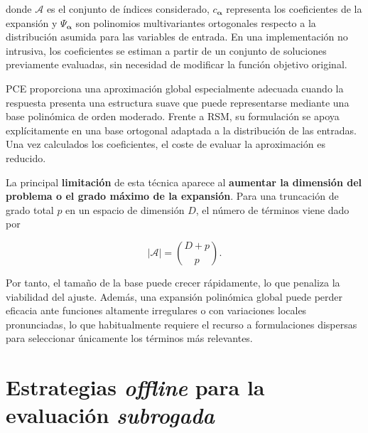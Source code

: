 donde \(\mathcal{A}\) es el conjunto de índices considerado, \(c_{\boldsymbol{\alpha}}\) representa los coeficientes de la expansión y \(\Psi_{\boldsymbol{\alpha}}\) son polinomios multivariantes ortogonales respecto a la distribución asumida para las variables de entrada. En una implementación no intrusiva, los coeficientes se estiman a partir de un conjunto de soluciones previamente evaluadas, sin necesidad de modificar la función objetivo original.

PCE proporciona una aproximación global especialmente adecuada cuando la respuesta presenta una estructura suave que puede representarse mediante una base polinómica de orden moderado. Frente a RSM, su formulación se apoya explícitamente en una base ortogonal adaptada a la distribución de las entradas. Una vez calculados los coeficientes, el coste de evaluar la aproximación es reducido.

La principal \textbf{limitación} de esta técnica aparece al \textbf{aumentar la dimensión del problema o el grado máximo de la expansión}. Para una truncación de grado total \(p\) en un espacio de dimensión \(D\), el número de términos viene dado por

\begin{equation}
    \left| \mathcal{A} \right|
    =
    \binom{D+p}{p}.
\end{equation}

Por tanto, el tamaño de la base puede crecer rápidamente, lo que penaliza la viabilidad del ajuste. Además, una expansión polinómica global puede perder eficacia ante funciones altamente irregulares o con variaciones locales pronunciadas, lo que habitualmente requiere el recurso a formulaciones dispersas para seleccionar únicamente los términos más relevantes.

\section{Estrategias \textit{offline} para la evaluación \textit{subrogada}}
\label{sec:metodologia_estrategias_offline}





